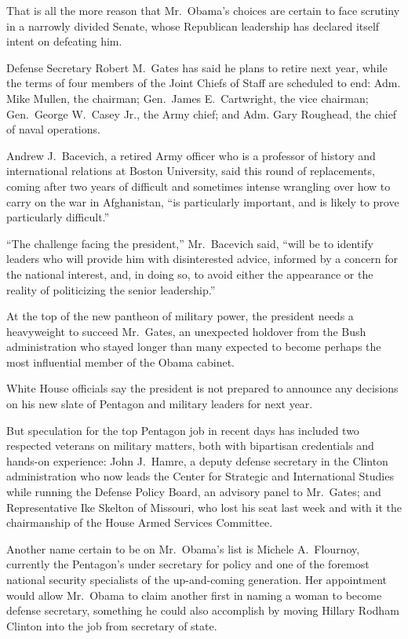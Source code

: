 ﻿\documentclass[12pt]{article}
\begin{document}
That is all the more reason that Mr.~Obama's choices are certain to face scrutiny in a narrowly
divided Senate, whose Republican leadership has declared itself intent on defeating him.

Defense Secretary Robert M.~Gates has said he plans to retire next year, while the terms of four
members of the Joint Chiefs of Staff are scheduled to end: Adm. Mike Mullen, the chairman;
Gen.~James E.~Cartwright, the vice chairman; Gen.~George W.~Casey Jr., the Army chief; and Adm. Gary
Roughead, the chief of naval operations.

Andrew J.~Bacevich, a retired Army officer who is a professor of history and international relations
at Boston University, said this round of replacements, coming after two years of difficult and
sometimes intense wrangling over how to carry on the war in Afghanistan, ``is particularly
important, and is likely to prove particularly difficult.''

``The challenge facing the president,'' Mr.~Bacevich said, ``will be to identify leaders who will
provide him with disinterested advice, informed by a concern for the national interest, and, in
doing so, to avoid either the appearance or the reality of politicizing the senior leadership.''

At the top of the new pantheon of military power, the president needs a heavyweight to succeed
Mr.~Gates, an unexpected holdover from the Bush administration who stayed longer than many expected
to become perhaps the most influential member of the Obama cabinet.

White House officials say the president is not prepared to announce any decisions on his new slate
of Pentagon and military leaders for next year.

But speculation for the top Pentagon job in recent days has included two respected veterans on
military matters, both with bipartisan credentials and hands-on experience: John J.~Hamre, a deputy
defense secretary in the Clinton administration who now leads the Center for Strategic and
International Studies while running the Defense Policy Board, an advisory panel to Mr.~Gates; and
Representative Ike Skelton of Missouri, who lost his seat last week and with it the chairmanship of
the House Armed Services Committee.

Another name certain to be on Mr.~Obama's list is Michele A.~Flournoy, currently the Pentagon's
under secretary for policy and one of the foremost national security specialists of the
up-and-coming generation. Her appointment would allow Mr.~Obama to claim another first in naming a
woman to become defense secretary, something he could also accomplish by moving Hillary Rodham
Clinton into the job from secretary of state.
\end{document}
